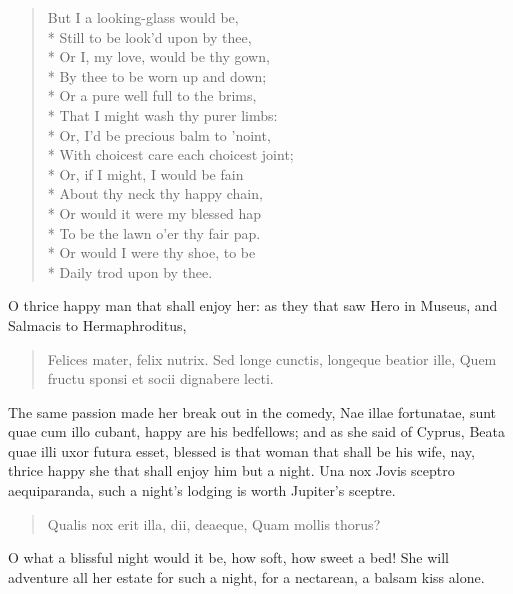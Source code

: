 \begin{verse}
But I a looking-glass would be,\\*
Still to be look'd upon by thee,\\*
Or I, my love, would be thy gown,\\*
By thee to be worn up and down;\\*
Or a pure well full to the brims,\\*
That I might wash thy purer limbs:\\*
Or, I'd be precious balm to 'noint,\\*
With choicest care each choicest joint;\\*
Or, if I might, I would be fain\\*
About thy neck thy happy chain,\\*
Or would it were my blessed hap\\*
To be the lawn o'er thy fair pap.\\*
Or would I were thy shoe, to be\\*
Daily trod upon by thee.
\end{verse}

O thrice happy man that shall enjoy her: as they that saw Hero in
Museus, and Salmacis to Hermaphroditus,

\begin{latin}
\begin{verse}
Felices mater, \etc{} felix nutrix.
Sed longe cunctis, longeque beatior ille,
Quem fructu sponsi et socii dignabere lecti.
\end{verse}
\end{latin}

The same passion made her break out in the comedy, Nae illae
fortunatae, sunt quae cum illo cubant, happy are his bedfellows; and as
she said of Cyprus, Beata quae illi uxor futura esset, blessed is
that woman that shall be his wife, nay, thrice happy she that shall
enjoy him but a night. Una nox Jovis sceptro aequiparanda, such a
night's lodging is worth Jupiter's sceptre.

\begin{latin}
\begin{verse}
Qualis nox erit illa, dii, deaeque,
Quam mollis thorus?
\end{verse}
\end{latin}

O what a blissful night would it be, how soft, how sweet a bed! She
will adventure all her estate for such a night, for a nectarean, a
balsam kiss alone.


